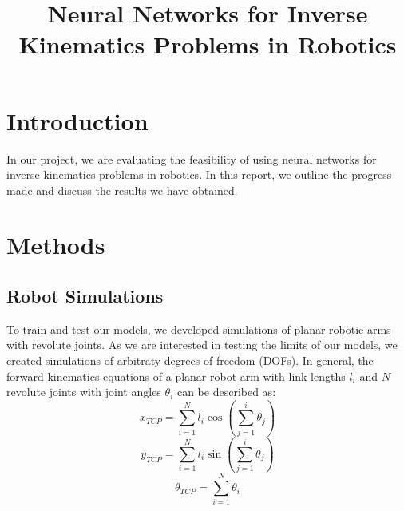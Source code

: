 \documentclass[conference]{IEEEtran}
\begin{document}
\title{Neural Networks for Inverse Kinematics Problems in Robotics}

\author{
    \and
}

\maketitle

\section*{Introduction}

In our project, we are evaluating the feasibility of using neural networks for inverse kinematics problems in robotics. In this report, we outline the progress made and discuss the results we have obtained.

\section*{Methods}
\subsection*{Robot Simulations}

To train and test our models, we developed simulations of planar robotic arms with revolute joints. As we are interested in testing the limits of our models, we created simulations of arbitraty degrees of freedom (DOFs). In general, the forward kinematics equations of a planar robot arm with link lengths \( l_i \) and \( N \) revolute joints with joint angles \( \theta_i \) can be described as:
\begin{equation}
    x_{TCP} = \sum_{i=1}^{N}{l_i \cos\left( \sum_{j=1}^{i}{\theta_j} \right)}
\end{equation}
\begin{equation}
    y_{TCP} = \sum_{i=1}^{N}{l_i \sin\left( \sum_{j=1}^{i}{\theta_j} \right)}
\end{equation}
\begin{equation}
    \theta_{TCP} = \sum_{i=1}^{N}{\theta_i}
\end{equation}
\end{document}
